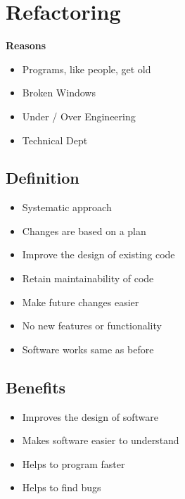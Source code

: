
\section{Refactoring}
\textbf{Reasons}
\begin{itemize}
    \item Programs, like people, get old
    \item Broken Windows
    \item Under / Over Engineering
    \item Technical Dept
\end{itemize}

\subsection{Definition}
\begin{itemize}
    \item Systematic approach
    \item Changes are based on a plan
    \item Improve the design of existing code
    \item Retain maintainability of code
    \item Make future changes easier
    \item No new features or functionality
    \item Software works same as before
\end{itemize}

\subsection{Benefits}
\begin{itemize}
    \item Improves the design of software
    \item Makes software easier to understand
    \item Helps to program faster
    \item Helps to find bugs
\end{itemize}


